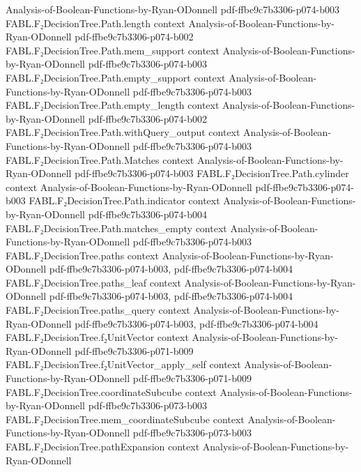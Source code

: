 \begin{theorem}
  {Analysis-of-Boolean-Functions-by-Ryan-ODonnell}
  {pdf-ffbe9c7b3306-p074-b003}
\proofstep
  {FABL.F₂DecisionTree.Path.length}
  {context}
  {Analysis-of-Boolean-Functions-by-Ryan-ODonnell}
  {pdf-ffbe9c7b3306-p074-b002}
\proofstep
  {FABL.F₂DecisionTree.Path.mem_support}
  {context}
  {Analysis-of-Boolean-Functions-by-Ryan-ODonnell}
  {pdf-ffbe9c7b3306-p074-b003}
\proofstep
  {FABL.F₂DecisionTree.Path.empty_support}
  {context}
  {Analysis-of-Boolean-Functions-by-Ryan-ODonnell}
  {pdf-ffbe9c7b3306-p074-b003}
\proofstep
  {FABL.F₂DecisionTree.Path.empty_length}
  {context}
  {Analysis-of-Boolean-Functions-by-Ryan-ODonnell}
  {pdf-ffbe9c7b3306-p074-b002}
\proofstep
  {FABL.F₂DecisionTree.Path.withQuery_output}
  {context}
  {Analysis-of-Boolean-Functions-by-Ryan-ODonnell}
  {pdf-ffbe9c7b3306-p074-b003}
\proofstep
  {FABL.F₂DecisionTree.Path.Matches}
  {context}
  {Analysis-of-Boolean-Functions-by-Ryan-ODonnell}
  {pdf-ffbe9c7b3306-p074-b003}
\proofstep
  {FABL.F₂DecisionTree.Path.cylinder}
  {context}
  {Analysis-of-Boolean-Functions-by-Ryan-ODonnell}
  {pdf-ffbe9c7b3306-p074-b003}
\proofstep
  {FABL.F₂DecisionTree.Path.indicator}
  {context}
  {Analysis-of-Boolean-Functions-by-Ryan-ODonnell}
  {pdf-ffbe9c7b3306-p074-b004}
\proofstep
  {FABL.F₂DecisionTree.Path.matches_empty}
  {context}
  {Analysis-of-Boolean-Functions-by-Ryan-ODonnell}
  {pdf-ffbe9c7b3306-p074-b003}
\proofstep
  {FABL.F₂DecisionTree.paths}
  {context}
  {Analysis-of-Boolean-Functions-by-Ryan-ODonnell}
  {pdf-ffbe9c7b3306-p074-b003,
    pdf-ffbe9c7b3306-p074-b004}
\proofstep
  {FABL.F₂DecisionTree.paths_leaf}
  {context}
  {Analysis-of-Boolean-Functions-by-Ryan-ODonnell}
  {pdf-ffbe9c7b3306-p074-b003,
    pdf-ffbe9c7b3306-p074-b004}
\proofstep
  {FABL.F₂DecisionTree.paths_query}
  {context}
  {Analysis-of-Boolean-Functions-by-Ryan-ODonnell}
  {pdf-ffbe9c7b3306-p074-b003,
    pdf-ffbe9c7b3306-p074-b004}
\proofstep
  {FABL.F₂DecisionTree.f₂UnitVector}
  {context}
  {Analysis-of-Boolean-Functions-by-Ryan-ODonnell}
  {pdf-ffbe9c7b3306-p071-b009}
\proofstep
  {FABL.F₂DecisionTree.f₂UnitVector_apply_self}
  {context}
  {Analysis-of-Boolean-Functions-by-Ryan-ODonnell}
  {pdf-ffbe9c7b3306-p071-b009}
\proofstep
  {FABL.F₂DecisionTree.coordinateSubcube}
  {context}
  {Analysis-of-Boolean-Functions-by-Ryan-ODonnell}
  {pdf-ffbe9c7b3306-p073-b003}
\proofstep
  {FABL.F₂DecisionTree.mem_coordinateSubcube}
  {context}
  {Analysis-of-Boolean-Functions-by-Ryan-ODonnell}
  {pdf-ffbe9c7b3306-p073-b003}
\proofstep
  {FABL.F₂DecisionTree.pathExpansion}
  {context}
  {Analysis-of-Boolean-Functions-by-Ryan-ODonnell}

\end{theorem}
